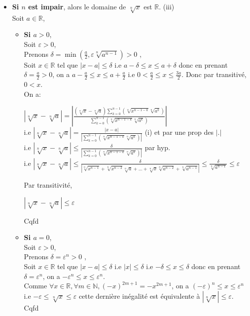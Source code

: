 \documentclass[a4paper,11pt]{report}
\begin{document}
\begin{itemize}
	\item \textbf{Si $n$ est impair}, alors le domaine de $\sqrt[n\,]{x}$ est $\mathbb{R}$. (iii)\\
	Soit $a \in \mathbb{R}$,\\
	\begin{itemize}
		\item \textbf{Si $a > 0$},\\
		Soit $\varepsilon > 0$,\\
		Prenons $\delta = \min{(\frac{a}{2},\varepsilon \sqrt[n\,]{a^{n-1}})}>0$ ,\\
		Soit $x \in \mathbb{R}$ tel que $|x-a| \le \delta$ i.e $a-\delta \le x \le a+\delta$ donc en prenant $\delta = \frac{a}{2} > 0$, on a $a-\frac{a}{2} \le x \le a+\frac{a}{2}$ i.e $0 < \frac{a}{2} \le x \le \frac{3a}{2}$. Donc par transitivé, $0 < x$.\\
		On a:\\
		\begin{center}
		$|\sqrt[n\,]{x}-\sqrt[n\,]{a}| = |\frac{(\sqrt[n\,]{x}-\sqrt[n\,]{a})\sum\limits_{k=0}^{n-1}{(\sqrt[n\,]{x^{n-1-k}}\sqrt[n\,]{a^k})}}{\sum\limits_{k=0}^{n-1}{(\sqrt[n\,]{x^{n-1-k}}\sqrt[n\,]{a^k})}}|$\\
		
		i.e $|\sqrt[n\,]{x}-\sqrt[n\,]{a}| = \frac{|x-a|}{|\sum\limits_{k=0}^{n-1}{(\sqrt[n\,]{x^{n-1-k}}\sqrt[n\,]{a^k})}|}$ (i) et par une prop des $|.|$\\
		
		i.e $|\sqrt[n\,]{x}-\sqrt[n\,]{a}| \le \frac{\delta}{|\sum\limits_{k=0}^{n-1}{(\sqrt[n\,]{x^{n-1-k}}\sqrt[n\,]{a^k})}|}$ par hyp.\\
		
		i.e $|\sqrt[n\,]{x}-\sqrt[n\,]{a}| \le \frac{\delta}{|\sqrt[n\,]{x^{n-1}}+\sqrt[n\,]{x^{n-2}}\sqrt[n\,]{a}+...+\sqrt[n\,]{x}\sqrt[n\,]{a^{n-2}}+\sqrt[n\,]{a^{n-1}}|} \le  \frac{\delta}{\sqrt[n\,]{a^{n-1}}} \le \varepsilon$\\
		\end{center}
		Par transitivité,\\
		\begin{center}
			$|\sqrt[n\,]{x}-\sqrt[n\,]{a}| \le \varepsilon$\\
		\end{center}
		Cqfd\\
		
		\item \textbf{Si $a = 0$},\\
		Soit $\varepsilon > 0$,\\
		Prenons $\delta = \varepsilon^n>0$ ,\\
		Soit $x \in \mathbb{R}$ tel que $|x-a| \le \delta$ i.e $|x| \le \delta$ i.e $-\delta \le x \le \delta$ donc en prenant $\delta = \varepsilon^n$, on a $-\varepsilon^n \le x \le \varepsilon^n$.\\ 
		Comme $\forall x \in \mathbb{R},\forall m \in \mathbb{N}, (-x)^{2m+1} = -x^{2m+1}$, on a $(-\varepsilon)^n \le x \le \varepsilon^n$ i.e $-\varepsilon \le \sqrt[n\,]{x} \le \varepsilon$ cette dernière inégalité est équivalente à $|\sqrt[n\,]{x}| \le \varepsilon$.\\
		Cqfd\\
		

\end{itemize}
\end{itemize}
\end{document}
